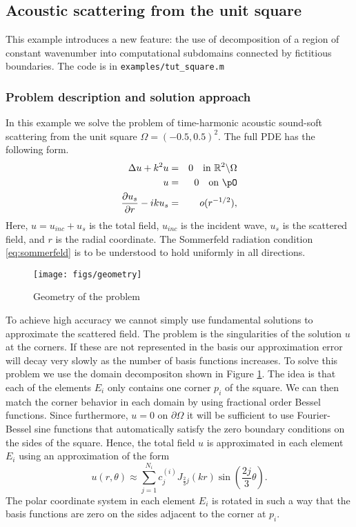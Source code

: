 \subsection{Acoustic scattering from the unit square}
\label{s:square}

This example introduces a new feature: the use of decomposition
of a region of constant wavenumber into computational subdomains connected
by fictitious boundaries. The code is in \verb?examples/tut_square.m?

\subsubsection{Problem description and solution approach}
\label{s:scatbvp}

In this example we solve the problem of time-harmonic 
acoustic sound-soft scattering from the unit square $\Omega=(-0.5,0.5)^2$.
The full PDE has the following form.
\begin{eqnarray}
\Delta u+k^2u & = & 0  \quad \text{in
}\mathbb{R}^2\backslash\Omega\label{eq:helm}\\
u&=&0 \quad \text{on } \pO \label{eq:soundsoft}\\
\frac{\partial u_s}{\partial r}-iku_s & = & o(r^{-1/2}),\label{eq:sommerfeld}
\end{eqnarray}
Here, $u=u_{inc}+u_s$ is the total field, $u_{inc}$ is the incident
wave, $u_s$ is the scattered field, and $r$ is the radial coordinate.
The Sommerfeld radiation condition
\eqref{eq:sommerfeld} is to be understood to hold uniformly in all
directions. 

\begin{figure}
\center
\texttt{[image: figs/geometry]}
\vspace{-.5cm}
\caption{Geometry of the problem}
\label{fig:geom}
\end{figure}


To achieve high accuracy we cannot simply use fundamental solutions
to approximate the scattered field. The problem is the singularities
of the solution $u$ at the corners. If these are not represented in
the basis our approximation error will decay very slowly as the number
of basis functions increases. To solve this problem we use the domain
decompositon shown in Figure \ref{fig:geom}. The idea is that each of
the elements $E_i$ only contains one corner $p_i$ of the square. We can then
match the corner behavior in each domain by using fractional order
Bessel functions. Since furthermore, $u=0$ on $\partial\Omega$ it will
be sufficient to use Fourier-Bessel sine functions that automatically
satisfy the zero boundary conditions on the sides of the square.
Hence, the total field $u$ is approximated in each element $E_i$ using
an approximation of the form
$$
u(r,\theta)\approx
\sum_{j=1}^{N_i}c_j^{(i)}J_{\frac{2}{3}j}(kr)\sin(\frac{2j}{3}\theta).
$$
The polar coordinate system in each element $E_i$ is rotated in such a way
that the basis functions are zero on the sides adjacent to the corner
at $p_i$.

